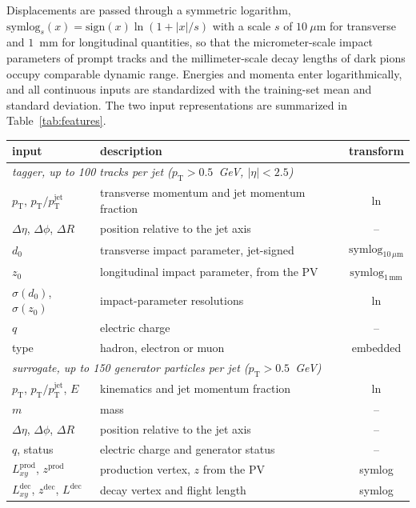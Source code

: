\documentclass[a4paper,11pt]{article}
\newcommand{\dnought}{d_0}
\newcommand{\znought}{z_0}
\newcommand{\dR}{\Delta R}
\newcommand{\pT}{p_{\mathrm{T}}}
\begin{document}
Displacements are passed through a symmetric logarithm,
$\mathrm{symlog}_{s}(x) = \mathrm{sign}(x)\ln(1 + |x|/s)$ with a
scale $s$ of $10~\mu\mathrm{m}$ for transverse and $1$~mm for
longitudinal quantities, so that the micrometer-scale impact parameters
of prompt tracks and the millimeter-scale decay lengths of dark pions
occupy comparable dynamic range. Energies and momenta enter
logarithmically, and all continuous inputs are standardized with the
training-set mean and standard deviation. The two input
representations are summarized in Table~\ref{tab:features}.

\begin{table}[htbp]
  \centering
  \small
  \setlength{\tabcolsep}{5pt}
  \begin{tabular}{llc}
    \toprule
    input & description & transform \\
    \midrule
    \multicolumn{3}{l}{\emph{tagger, up to 100 tracks per jet ($\pT > 0.5$~GeV, $|\eta| < 2.5$)}} \\
    $\pT$, $\pT/\pT^{\mathrm{jet}}$ & transverse momentum and jet momentum fraction & $\ln$ \\
    $\Delta\eta$, $\Delta\phi$, $\dR$ & position relative to the jet axis & -- \\
    $\dnought$ & transverse impact parameter, jet-signed & $\mathrm{symlog}_{10\,\mu\mathrm{m}}$ \\
    $\znought$ & longitudinal impact parameter, from the PV & $\mathrm{symlog}_{1\,\mathrm{mm}}$ \\
    $\sigma(\dnought)$, $\sigma(\znought)$ & impact-parameter resolutions & $\ln$ \\
    $q$ & electric charge & -- \\
    type & hadron, electron or muon & embedded \\
    \midrule
    \multicolumn{3}{l}{\emph{surrogate, up to 150 generator particles per jet ($\pT > 0.5$~GeV)}} \\
    $\pT$, $\pT/\pT^{\mathrm{jet}}$, $E$ & kinematics and jet momentum fraction & $\ln$ \\
    $m$ & mass & -- \\
    $\Delta\eta$, $\Delta\phi$, $\dR$ & position relative to the jet axis & -- \\
    $q$, status & electric charge and generator status & -- \\
    $L_{xy}^{\mathrm{prod}}$, $z^{\mathrm{prod}}$ & production vertex, $z$ from the PV & symlog \\
    $L_{xy}^{\mathrm{dec}}$, $z^{\mathrm{dec}}$, $L^{\mathrm{dec}}$ & decay vertex and flight length & symlog \\

\end{tabular}
\end{table}
\end{document}
